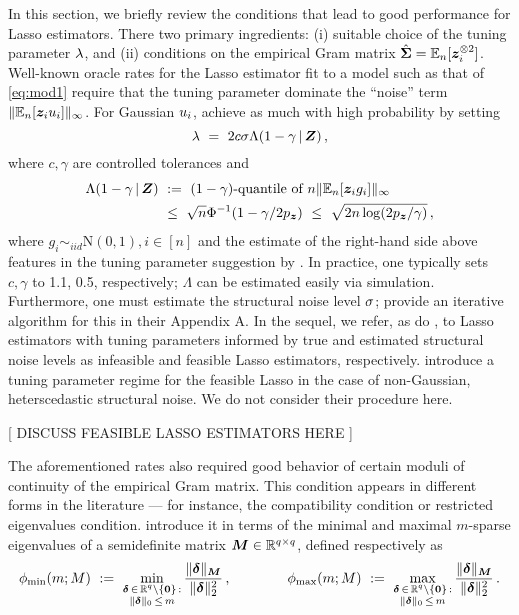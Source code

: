 \documentclass{uwstat572}
\newcommand{\be}{\begin{equation}}
\newcommand{\ee}{\end{equation}}
\newcommand{\benn}{\begin{equation*}}
\newcommand{\eenn}{\end{equation*}}
\theoremstyle{definition}
\theoremstyle{remark}
\newcommand{\R}{\ensuremath{\mathbb{R}}}
\newcommand{\Ex}{\mathbb{E}}
\newcommand{\Exn}{\Ex_n}
\newcommand{\Normal}{\mathrm{N}}
\newcommand{\bs}[1]{\boldsymbol{#1}}
\numberwithin{equation}{section}
\begin{document}
In this section, we briefly review the conditions that lead to good performance for Lasso estimators. There two primary ingredients: (i) suitable choice of the tuning parameter $\lambda$, and (ii) conditions on the empirical Gram matrix $\gramhat = \Exn[\z_i^{\kpt}]$. Well-known oracle rates for the Lasso estimator fit to a model such as that of \eqref{eq:mod1} require that the tuning parameter dominate the ``noise'' term $\|\Exn[\z_i\esi]\|_\infty$. For Gaussian $u_i$, \cite{BC13} achieve as much with high probability by setting
\be\label{tune1}
	\tune \ = \ 2 c \sd \Lambda(1-\gamma\,|\,\Z)\,,
\ee
where $c, \gamma$ are controlled tolerances and 
\begin{align*}
	\Lambda(1 - \gamma\,|\,\Z) \ & := \ (1-\gamma)\text{-quantile of } n\|\Exn[\z_ig_i]\|_\infty\\
	& \leq \ \sqrt{n}\Phi^{-1}(1-\gamma/2\pz) \ \leq \ \sqrt{2n\log(2\pz/\gamma)} \,,
\end{align*}
where $g_i \sim_{iid} \Normal(0,1), i\in[n]$ and the estimate of the right-hand side above features in the tuning parameter suggestion by \cite{BRT09}. In practice, one typically sets $c,\gamma$ to 1.1, 0.5, respectively; $\Lambda$ can be estimated easily via simulation. Furthermore, one must estimate the structural noise level $\sigma$; \cite{BCH11} provide an iterative algorithm for this in their Appendix A. In the sequel, we refer, as do \cite{BCH11}, to Lasso estimators with tuning parameters informed by true and estimated structural noise levels as infeasible and feasible Lasso estimators, respectively. \cite{BCCH12} introduce a tuning parameter regime for the feasible Lasso in the case of non-Gaussian, heterscedastic structural noise. We do not consider their procedure here. 

[ DISCUSS FEASIBLE LASSO ESTIMATORS HERE ]

The aforementioned rates also required good behavior of certain moduli of continuity of the empirical Gram matrix. This condition appears in different forms in the literature --- for instance, the compatibility condition or restricted eigenvalues condition. \cite{BCH11} introduce it in terms of the minimal and maximal $m$-sparse eigenvalues of a semidefinite matrix $\M \in \R^{q \times q}$, defined respectively as
\benn
	\minse(m; M) \ := \ \min_{\substack{\diff\,\in\,\R^q\setminus\{\bs{0}\} \,: \\ \|\diff\|_0 \,\leq\, m}} \frac{\|\diff\|_{\M}}{\|\diff\|_2^2}\,, \qquad\qquad
	\maxse(m; M) \ := \ \max_{\substack{\diff\,\in\,\R^q\setminus\{\bs{0}\} \,: \\ \|\diff\|_0 \,\leq\, m}} \frac{\|\diff\|_{\M}}{\|\diff\|_2^2}\,.
\eenn
\end{document}
